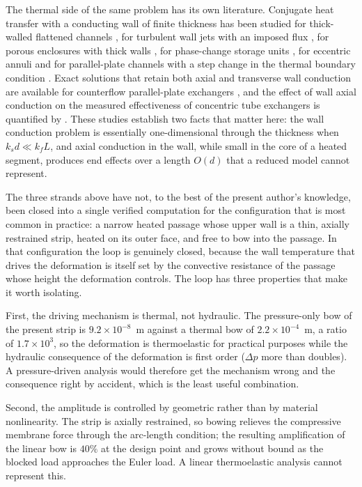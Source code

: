 \documentclass[11pt,a4paper]{article}
\begin{document}
The thermal side of the same problem has its own literature. Conjugate heat
transfer with a conducting wall of finite thickness has been studied for
thick-walled flattened channels \citep{rahimi2024numerical}, for turbulent
wall jets with an imposed flux \citep{vishnuvardhanarao2009computational},
for porous enclosures with thick walls \citep{varol2009conjugate}, for
phase-change storage units \citep{li1996conjugate}, for eccentric annuli
\citep{elshaarawi2001critical} and for parallel-plate channels with a step
change in the thermal boundary condition \citep{hassab2013effect}. Exact
solutions that retain both axial and transverse wall conduction are available
for counterflow parallel-plate exchangers \citep{quintero2017laminar}, and the
effect of wall axial conduction on the measured effectiveness of concentric
tube exchangers is quantified by \citet{arici2010heat}. These studies
establish two facts that matter here: the wall conduction problem is
essentially one-dimensional through the thickness when $k_s d \ll k_f L$, and
axial conduction in the wall, while small in the core of a heated segment,
produces end effects over a length $O(d)$ that a reduced model cannot
represent.

The three strands above have not, to the best of the present author's
knowledge, been closed into a single verified computation for the
configuration that is most common in practice: a narrow heated passage whose
upper wall is a thin, axially restrained strip, heated on its outer face, and
free to bow into the passage. In that configuration the loop is genuinely
closed, because the wall temperature that drives the deformation is itself
set by the convective resistance of the passage whose height the deformation
controls. The loop has three properties that make it worth isolating.

First, the driving mechanism is thermal, not hydraulic. The pressure-only bow
of the present strip is $9.2\times10^{-8}$~m against a thermal bow of
$2.2\times10^{-4}$~m, a ratio of $1.7\times10^{3}$, so the deformation is
thermoelastic for practical purposes while the hydraulic consequence of the
deformation is first order ($\Delta p$ more than doubles). A pressure-driven
analysis would therefore get the mechanism wrong and the consequence right by
accident, which is the least useful combination.

Second, the amplitude is controlled by geometric rather than by material
nonlinearity. The strip is axially restrained, so bowing relieves the
compressive membrane force through the arc-length condition; the resulting
amplification of the linear bow is $40\%$ at the design point and grows
without bound as the blocked load approaches the Euler load. A linear
thermoelastic analysis cannot represent this.
\end{document}
